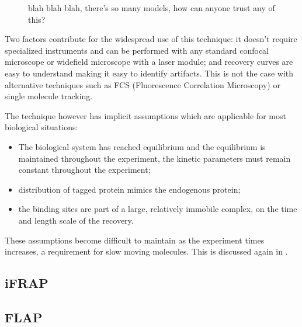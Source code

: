     \begin{figure}
      \centering
      \caption{blah blah blah, there's so many models, how can anyone trust
               any of this?}
      \label{fig:intro:frap-model-components}
    \end{figure}

    Two factors contribute for the widespread use of this technique:
    it doesn't require specialized instruments and can be performed with
    any standard confocal microscope or widefield microscope with a laser
    module; and recovery curves are easy to understand making it easy to
    identify artifacts.  This is not the case with alternative techniques
    such as FCS (Fluorescence Correlation Microscopy) or single molecule
    tracking.

    The technique however has implicit assumptions which are applicable
    for most biological situations:

    \begin{itemize}
      \item The biological system has reached equilibrium and the equilibrium
        is maintained throughout the experiment, \ie{} the kinetic parameters
        must remain constant throughout the experiment;

      \item distribution of tagged protein mimics the endogenous protein;

      \item the binding sites are part of a large, relatively immobile
        complex, on the time and length scale of the recovery.
    \end{itemize}

    These assumptions become difficult to maintain as the experiment
    times increases, a requirement for slow moving molecules.  This
    is discussed again in .

  \subsection{iFRAP}


  \subsection{FLAP}

